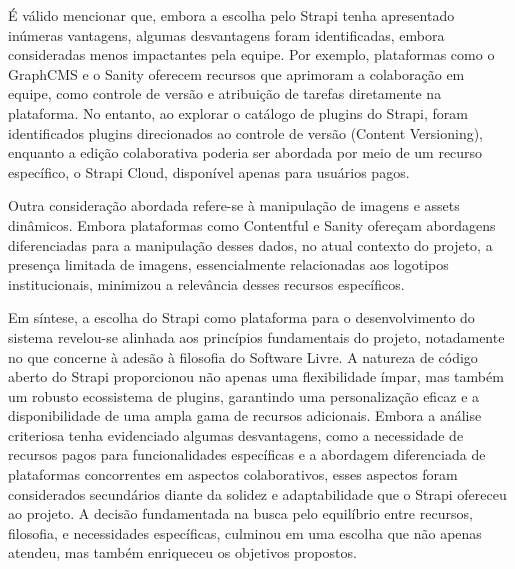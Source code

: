     É válido mencionar que, embora a escolha pelo Strapi tenha apresentado inúmeras vantagens, algumas desvantagens foram identificadas, embora consideradas menos impactantes pela equipe. Por exemplo, plataformas como o GraphCMS e o Sanity oferecem recursos que aprimoram a colaboração em equipe, como controle de versão e atribuição de tarefas diretamente na plataforma. No entanto, ao explorar o catálogo de plugins do Strapi, foram identificados plugins direcionados ao controle de versão (Content Versioning), enquanto a edição colaborativa poderia ser abordada por meio de um recurso específico, o Strapi Cloud, disponível apenas para usuários pagos.

    Outra consideração abordada refere-se à manipulação de imagens e assets dinâmicos. Embora plataformas como Contentful e Sanity ofereçam abordagens diferenciadas para a manipulação desses dados, no atual contexto do projeto, a presença limitada de imagens, essencialmente relacionadas aos logotipos institucionais, minimizou a relevância desses recursos específicos.

    Em síntese, a escolha do Strapi como plataforma para o desenvolvimento do sistema revelou-se alinhada aos princípios fundamentais do projeto, notadamente no que concerne à adesão à filosofia do Software Livre. A natureza de código aberto do Strapi proporcionou não apenas uma flexibilidade ímpar, mas também um robusto ecossistema de plugins, garantindo uma personalização eficaz e a disponibilidade de uma ampla gama de recursos adicionais. Embora a análise criteriosa tenha evidenciado algumas desvantagens, como a necessidade de recursos pagos para funcionalidades específicas e a abordagem diferenciada de plataformas concorrentes em aspectos colaborativos, esses aspectos foram considerados secundários diante da solidez e adaptabilidade que o Strapi ofereceu ao projeto. A decisão fundamentada na busca pelo equilíbrio entre recursos, filosofia, e necessidades específicas, culminou em uma escolha que não apenas atendeu, mas também enriqueceu os objetivos propostos.